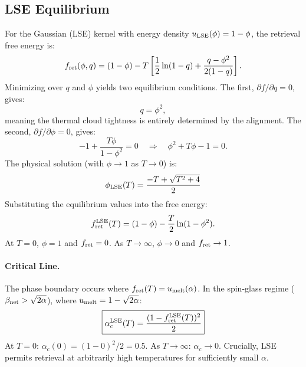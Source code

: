 \documentclass{article}
\theoremstyle{plain}
\theoremstyle{definition}
\theoremstyle{remark}
\begin{document}
\subsection{LSE Equilibrium}

For the Gaussian (LSE) kernel with energy density $u_{\rm LSE}(\phi) = 1 - \phi$, the retrieval free energy is:
\begin{equation}
    f_{\rm ret}(\phi, q) = (1 - \phi) - T \left[ \frac{1}{2}\ln(1-q) + \frac{q - \phi^2}{2(1-q)} \right].
\end{equation}
Minimizing over $q$ and $\phi$ yields two equilibrium conditions. The first, $\partial f/\partial q = 0$, gives:
\begin{equation}
    q = \phi^2,
    \label{eq:q_constraint}
\end{equation}
meaning the thermal cloud tightness is entirely determined by the alignment. The second, $\partial f/\partial \phi = 0$, gives:
\begin{equation}
    -1 + \frac{T\phi}{1-\phi^2} = 0 \quad \Rightarrow \quad \phi^2 + T\phi - 1 = 0.
\end{equation}
The physical solution (with $\phi \to 1$ as $T \to 0$) is:
\begin{equation}
    \phi_{\rm LSE}(T) = \frac{-T + \sqrt{T^2 + 4}}{2}
    \label{eq:phi_lse}
\end{equation}
Substituting the equilibrium values into the free energy:
\begin{equation}
    f_{\rm ret}^{\rm LSE}(T) = (1 - \phi) - \frac{T}{2}\ln(1 - \phi^2).
    \label{eq:f_lse}
\end{equation}
At $T = 0$, $\phi = 1$ and $f_{\rm ret} = 0$. As $T \to \infty$, $\phi \to 0$ and $f_{\rm ret} \to 1$.

\paragraph{Critical Line.} The phase boundary occurs where $f_{\rm ret}(T) = u_{\rm melt}(\alpha)$. In the spin-glass regime ($\beta_{\rm net} > \sqrt{2\alpha}$), where $u_{\rm melt} = 1 - \sqrt{2\alpha}$:
\begin{equation}
    \boxed{\alpha_c^{\rm LSE}(T) = \frac{(1 - f_{\rm ret}^{\rm LSE}(T))^2}{2}}
    \label{eq:alpha_lse}
\end{equation}
At $T = 0$: $\alpha_c(0) = (1-0)^2/2 = 0.5$. As $T \to \infty$: $\alpha_c \to 0$. Crucially, LSE permits retrieval at arbitrarily high temperatures for sufficiently small $\alpha$.
\end{document}
